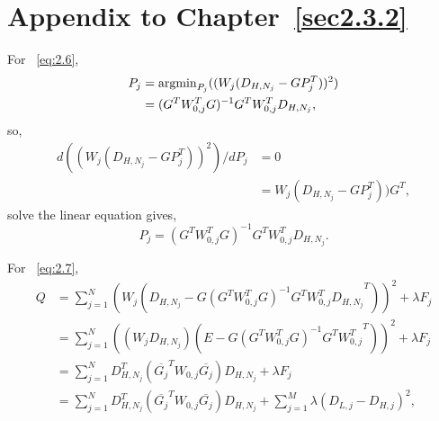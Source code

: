 \setcounter{section}{0}
\let\oldthesection\thesection
\renewcommand{\thesection}{\thechapter.\Alph{section}}
\section{Appendix to Chapter~\ref{sec2.3.2}}
\label{ap1}
For ~\eqref{eq:2.6},
\begin{equation}
\begin{split}
P_{j} &=  {\operatorname*{argmin}}_{P_{j}}{((W_{j}(D_{H,N_{j}}-GP_{j}^T))^2)}\\
&= (G^{T}W_{0,j}^{T}G)^{-1}G^{T}W_{0,j}^{T}D_{H,N_{j}},
\end{split}
\end{equation}
so,
\begin{equation}
\begin{split}
d((W_{j}(D_{H,N_{j}}-GP_{j}^T))^2)/dP_{j} &= 0\\
&= W_{j}(D_{H,N_{j}}-GP_{j}^T))G^T,
\end{split}
\end{equation}
solve the linear equation gives,
\begin{equation}
P_{j} = (G^{T}W_{0,j}^{T}G)^{-1}G^{T}W_{0,j}^{T}D_{H,N_{j}}.
\end{equation}

For ~\eqref{eq:2.7},
\begin{equation}
\begin{split}
Q &= \sum_{j=1}^{N}{(W_{j}(D_{H,N_{j}}-G{(G^{T}W_{0,j}^{T}G)^{-1}G^{T}W_{0,j}^{T}D_{H,N_{j}}}^T))^2+{\lambda}F_{j}}\\
&= \sum_{j=1}^{N}{((W_{j}D_{H,N_{j}})(E-G{(G^{T}W_{0,j}^{T}G)^{-1}G^{T}W_{0,j}^{T}}^T))^2+{\lambda}F_{j}}\\
&= \sum_{j=1}^{N}{D_{H,N_{j}}^{T}(\overline{G_{j}}^{T}W_{0,j}\overline{G_{j}})D_{H,N_{j}}}+{\lambda}F_{j}\\
&= \sum_{j=1}^{N}{D_{H,N_{j}}^{T}(\overline{G_{j}}^{T}W_{0,j}\overline{G_{j}})D_{H,N_{j}}}+\sum_{j=1}^{M}{\lambda(D_{L,j}-D_{H,j})^2},
\end{split}
\label{eq:2.7}
\end{equation}


\renewcommand{\thesection}{\thechapter.\Alph{section}}
